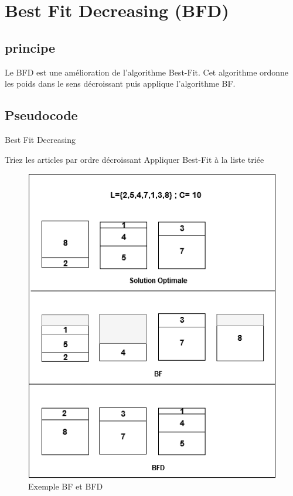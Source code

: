 \documentclass[12pt]{article}
\begin{document}
\section{Best Fit Decreasing (BFD)}
\subsection{principe}
Le BFD est une amélioration de l’algorithme Best-Fit. Cet algorithme ordonne les poids dans le sens décroissant puis applique l’algorithme BF.

\subsection{Pseudocode}

\begin{algorithm}[!h]
    \caption{Best Fit Decreasing }
    \begin{algorithmic}
        \STATE Triez les articles par ordre décroissant
        \STATE Appliquer Best-Fit à la liste triée 
    \end{algorithmic}
\end{algorithm}


\begin{figure}[H]
    \includegraphics[width=\linewidth]{../figures/BF BFD.png}
    \caption{Exemple BF et BFD}
\end{figure}
\newpage
\end{document}
